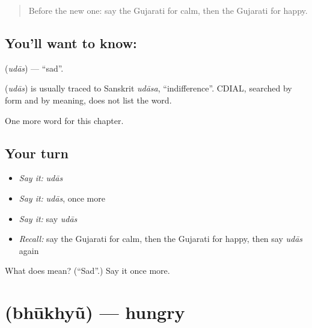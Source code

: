 \label{lesson:GU-C134-udas}



\begin{quote}
Before the new one: say the Gujarati for calm, then the Gujarati for happy.
\end{quote}

\subsection*{You'll want to know: }
\textbf{} (\emph{udās}) — \textquotedblleft{}sad\textquotedblright{}.

\begin{cousinweb}
\textbf{} (\emph{udās}) is usually traced to Sanskrit \emph{udāsa}, \textquotedblleft{}indifference\textquotedblright{}. CDIAL, searched by form and by meaning, does not list the word.
\end{cousinweb}

\begin{grammarlens}[title={What you've built}]
One more word for this chapter.
\end{grammarlens}

\subsection*{Your turn}
\begin{itemize}
\raggedright
  \item \emph{Say it:} \emph{udās}
  \item \emph{Say it:} \emph{udās}, once more
  \item \emph{Say it:} say \emph{udās}
  \item \emph{Recall:} say the Gujarati for calm, then the Gujarati for happy, then say \emph{udās} again
\end{itemize}

\begin{tcolorbox}[breakable,colback=teal!4,colframe=teal!35!black,title={Before you move on}]
What does  mean? (\textquotedblleft{}Sad\textquotedblright{}.) Say it once more.
\end{tcolorbox}
\section[\texorpdfstring{\gu{ભૂખ્યું} (bhūkhyũ)}{ભૂખ્યું (bhūkhyũ)}]{ (bhūkhyũ) — hungry}

\label{lesson:GU-C134-bhukhyu}




